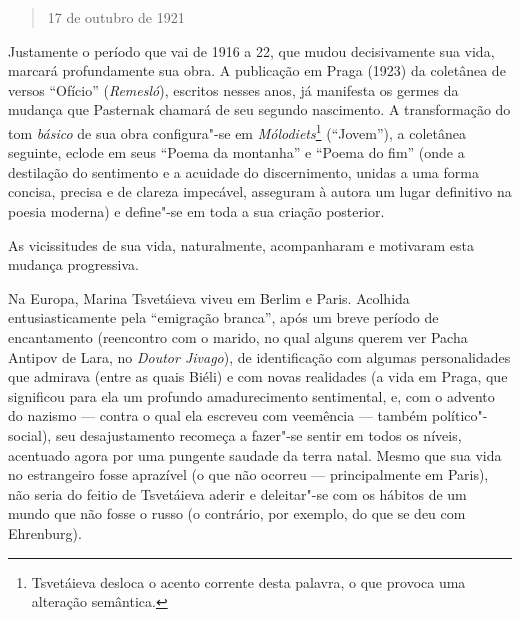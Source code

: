 {{{\begin{verse}
17 de outubro de 1921

\end{verse}

Justamente o período que vai de 1916 a 22, que mudou decisivamente sua
vida, marcará profundamente sua obra. A publicação em Praga (1923) da
coletânea de versos ``Ofício'' (\emph{Remesló}), escritos nesses anos, já
manifesta os germes da mudança que Pasternak chamará de seu segundo
nascimento. A transformação do tom \emph{básico} de sua obra
configura"-se em \emph{Mólodiets}\footnote{Tsvetáieva desloca o acento
  corrente desta palavra, o que provoca uma alteração semântica.}
(``Jovem''), a coletânea seguinte, eclode em seus ``Poema da montanha''
e ``Poema do fim'' (onde a destilação do sentimento e a acuidade do
discernimento, unidas a uma forma concisa, precisa e de clareza
impecável, asseguram à autora um lugar definitivo na poesia moderna) e
define"-se em toda a sua criação posterior.

As vicissitudes de sua vida, naturalmente, acompanharam e motivaram esta
mudança progressiva.

Na Europa, Marina Tsvetáieva viveu em Berlim e Paris. Acolhida
entusiasticamente pela ``emigração branca'', após um breve período de
encantamento (reencontro com o marido, no qual alguns querem ver Pacha
Antipov de Lara, no \emph{Doutor Jivago}), de identificação com algumas
personalidades que admirava (entre as quais Biéli) e com novas
realidades (a vida em Praga, que significou para ela um profundo
amadurecimento sentimental, e, com o advento do nazismo --- contra o qual
ela escreveu com veemência --- também político"-social), seu
desajustamento recomeça a fazer"-se sentir em todos os níveis, acentuado
agora por uma pungente saudade da terra natal. Mesmo que sua vida no
estrangeiro fosse aprazível (o que não ocorreu --- principalmente em
Paris), não seria do feitio de Tsvetáieva aderir e deleitar"-se com os
hábitos de um mundo que não fosse o russo (o contrário, por exemplo, do
que se deu com Ehrenburg).

}}}
